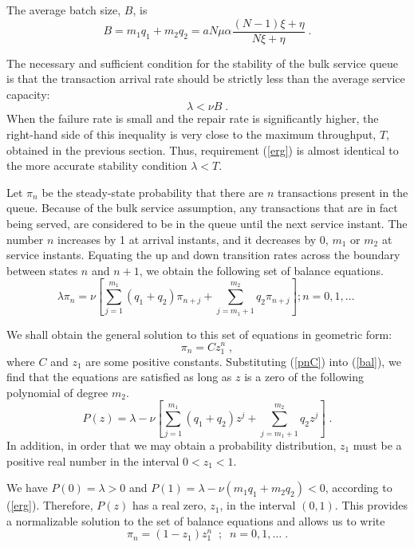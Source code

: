 The average batch size, $B$, is
\begin{equation} \label{B}
B = m_1q_1 + m_2q_2 = aN\mu\alpha\frac{(N-1)\xi+\eta}{N\xi+\eta} \;.
\end{equation}

The necessary and sufficient condition for the stability of the bulk service queue
is that the transaction arrival rate should be strictly less than the average service capacity:
\begin{equation} \label{erg}
\lambda < \nu B \;.
\end{equation}
When the failure rate is small and the repair rate is significantly higher, the
right-hand side of this inequality is very close to the maximum throughput, $T$,
obtained in the previous section. Thus, requirement (\ref{erg}) is almost identical
to the more accurate stability condition $\lambda < T$.

Let $\pi_n$ be the steady-state probability that there are $n$ transactions present in the
queue. Because of the bulk service assumption, any transactions that are in fact being
served, are considered to be in the queue until the next service instant. The
number $n$ increases by 1 at arrival instants, and it decreases by 0, $m_1$ or
$m_2$ at service instants. Equating the up and down transition rates across
the boundary between states $n$ and $n+1$, we obtain the following set of
balance equations.
\begin{equation} \label{bal}
\lambda \pi_n = \nu \left [ \sum_{j=1}^{m_1} (q_1+q_2) \pi_{n+j}
+ \sum_{j=m_1+1}^{m_2} q_2 \pi_{n+j} \right ];n=0,1,\ldots\;
\end{equation}

We shall obtain the general solution to this set of equations in geometric form:
\begin{equation} \label{pnC}
\pi_n= Cz_1^n\;,
\end{equation}
where $C$ and $z_1$ are some positive constants. Substituting (\ref{pnC}) into
(\ref{bal}), we find that the equations are satisfied as long as $z$ is a zero of the
following polynomial of degree $m_2$.
\begin{equation} \label{pz}
P(z) = \lambda - \nu\left [ \sum_{j=1}^{m_1} (q_1+q_2) z^j
+ \sum_{j=m_1+1}^{m_2} q_2 z^j \right ]\;.
\end{equation}
In addition, in order that we may obtain a probability distribution, $z_1$ must be
a positive real number in the interval $0<z_1<1$.

We have $P(0)=\lambda >0$ and $P(1)= \lambda - \nu (m_1q_1+m_2q_2) <0$,
according to (\ref{erg}). Therefore, $P(z)$ has a real zero, $z_1$, in the interval
$(0,1)$. This provides a normalizable solution to the set of balance equations and
allows us to write
\begin{equation} \label{pn}
\pi_n = (1-z_1) z_1^n \;\;;\;\;n=0,1,\ldots\;.
\end{equation}

